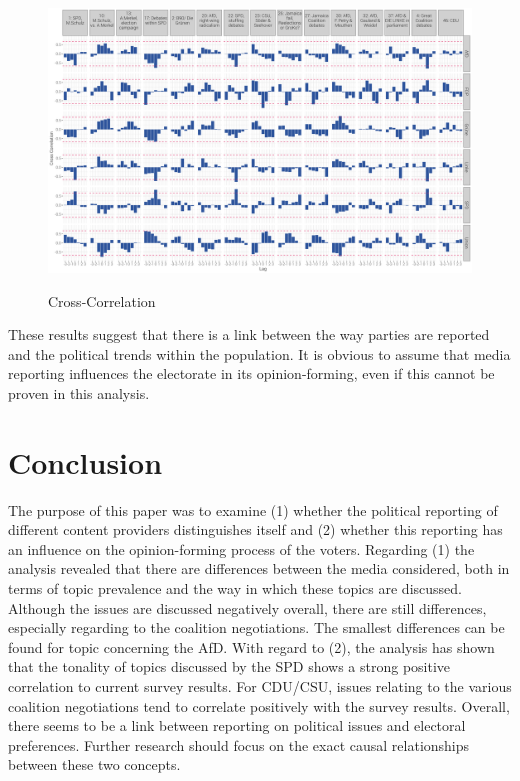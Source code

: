 \documentclass[12pt,a4paper,notitlepage]{article}
\begin{document}
\begin{figure}[H]
	\caption{Cross-Correlation}
	\begin{center}
			\includegraphics[width=\textwidth,keepaspectratio]{../figs/ccf2.png}
			\label{fig_ccf}
	\end{center}
\end{figure}

These results suggest that there is a link between the way parties are reported and the political trends within the population. It is obvious to assume that media reporting influences the electorate in its opinion-forming, even if this cannot be proven in this analysis. 

\section{Conclusion}

The purpose of this paper was to examine (1) whether the political reporting of different content providers distinguishes itself and (2) whether this reporting has an influence on the opinion-forming process of the voters. Regarding (1) the analysis revealed that there are differences between the media considered, both in terms of topic prevalence and the way in which these topics are discussed. Although the issues are discussed negatively overall, there are still differences, especially regarding to the coalition negotiations. The smallest differences can be found for topic concerning the AfD. With regard to (2), the analysis has shown that the tonality of topics discussed by the SPD shows a strong positive correlation to current survey results. For CDU/CSU, issues relating to the various coalition negotiations tend to correlate positively with the survey results.  Overall, there seems to be a link between reporting on political issues and electoral preferences. Further research should focus on the exact causal relationships between these two concepts. 
\end{document}
